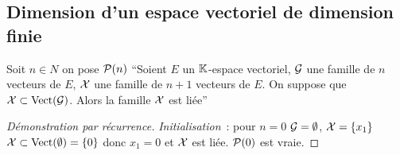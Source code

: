 \subsection{Dimension d'un espace vectoriel de dimension finie}

\begin{lemme}
  Soit \(n \in N\) on pose \(\P(n)\) ``Soient \(E\) un \(\K\)-espace vectoriel, \(\G\) une famille de \(n\) vecteurs de \(E\), \(\X\) une famille de \(n+1\) vecteurs de \(E\). On suppose que \(\X \subset \VectEngendre(\G)\). Alors la famille \(\X\) est liée''
\end{lemme}
\begin{proof}[Démonstration par récurrence]
  \emph{Initialisation}~: pour \(n=0\) \(\G=\emptyset\), \(\X=\{x_1\}\) \(\X \subset \VectEngendre(\emptyset)=\{0\}\) donc \(x_1=0\) et \(\X\) est liée. \(\P(0)\) est vraie.


\end{proof}
